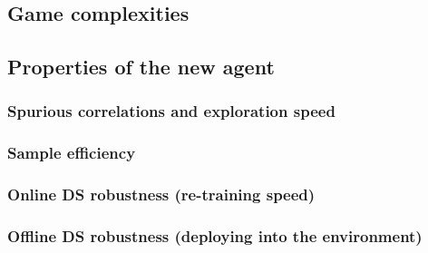 \documentclass[a4paper,11pt,oneside]{report}
\begin{document}
\subsection{Game complexities}
\subsection{Properties of the new agent}
\subsubsection{Spurious correlations and exploration speed}
\subsubsection{Sample efficiency}
\subsubsection{Online DS robustness (re-training speed)}
\subsubsection{Offline DS robustness (deploying into the environment)}
\end{document}
